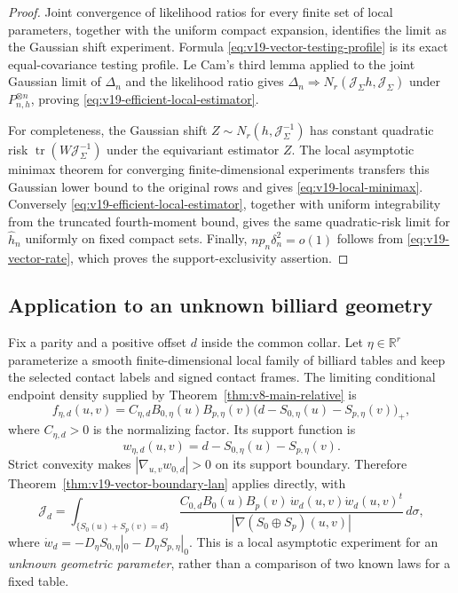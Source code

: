 \begin{proof}
Joint convergence of likelihood ratios for every finite set of local
parameters, together with the uniform compact expansion, identifies the
limit as the Gaussian shift experiment.  Formula
\eqref{eq:v19-vector-testing-profile} is its exact equal-covariance testing
profile.  Le Cam's third lemma applied to the joint Gaussian limit of
$\Delta_n$ and the likelihood ratio gives
$\Delta_n\Rightarrow N_r(\mathcal J_\Sigma h,\mathcal J_\Sigma)$ under
$P_{n,h}^{\otimes n}$, proving
\eqref{eq:v19-efficient-local-estimator}.

For completeness, the Gaussian shift $Z\sim N_r(h,\mathcal J_\Sigma^{-1})$
has constant quadratic risk
$\operatorname{tr}(W\mathcal J_\Sigma^{-1})$ under the equivariant estimator
$Z$.  The local asymptotic minimax theorem for converging finite-dimensional
experiments transfers this Gaussian lower bound to the original rows
\cite{IbragimovHasminskii,HiranoPorter} and gives
\eqref{eq:v19-local-minimax}.  Conversely
\eqref{eq:v19-efficient-local-estimator}, together with uniform integrability
from the truncated fourth-moment bound, gives the same quadratic-risk limit
for $\widehat h_n$ uniformly on fixed compact sets.  Finally,
$np_n\delta_n^2=o(1)$ follows from \eqref{eq:v19-vector-rate}, which proves
the support-exclusivity assertion.
\end{proof}

\subsection{Application to an unknown billiard geometry}
Fix a parity and a positive offset $d$ inside the common collar.  Let
$\eta\in\mathbb R^r$ parameterize a smooth finite-dimensional local family
of billiard tables and keep the selected contact labels and signed contact
frames.  The limiting conditional endpoint density supplied by
Theorem~\ref{thm:v8-main-relative} is
\begin{equation}\label{eq:v19-billiard-endpoint-family}
 f_{\eta,d}(u,v)=C_{\eta,d}
 B_{0,\eta}(u)B_{p,\eta}(v)
 \bigl(d-S_{0,\eta}(u)-S_{p,\eta}(v)\bigr)_+,
\end{equation}
where $C_{\eta,d}>0$ is the normalizing factor.  Its support function is
\[
 w_{\eta,d}(u,v)=d-S_{0,\eta}(u)-S_{p,\eta}(v).
\]
Strict convexity makes $|\nabla_{u,v}w_{0,d}|>0$ on its support boundary.
Therefore Theorem~\ref{thm:v19-vector-boundary-lan} applies directly, with
\begin{equation}\label{eq:v19-billiard-information-matrix}
 \mathcal J_d=
 \int_{\{S_0(u)+S_p(v)=d\}}
 \frac{C_{0,d}B_0(u)B_p(v)\,
       \dot w_d(u,v)\dot w_d(u,v)^t}
      {|\nabla(S_0\oplus S_p)(u,v)|}\,d\sigma,
\end{equation}
where
$\dot w_d=-D_\eta S_{0,\eta}|_0-D_\eta S_{p,\eta}|_0$.
This is a local asymptotic experiment for an \emph{unknown geometric
parameter}, rather than a comparison of two known laws for a fixed table.

